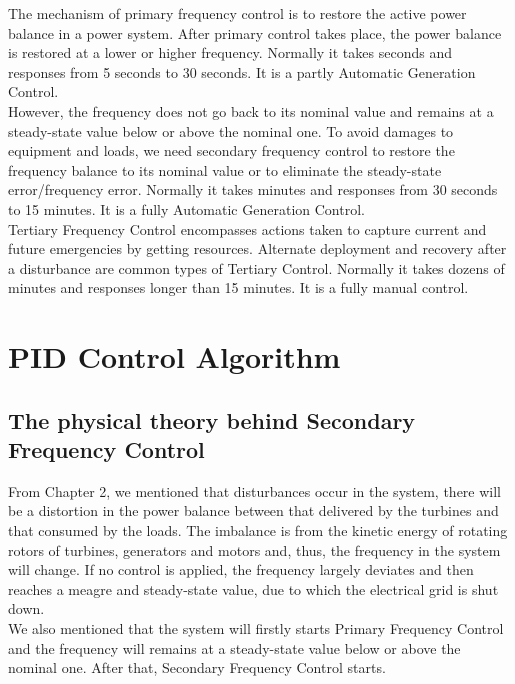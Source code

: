 \documentclass{report}
\begin{document}
The mechanism of primary frequency control is to restore the active power balance in a power system. After primary control takes place, the power balance is restored at a lower or higher frequency. Normally it takes seconds and responses from 5 seconds to 30 seconds. It is a partly Automatic Generation Control.\\


However, the frequency does not go back to its nominal value and remains at a steady-state value below or above the nominal one. To avoid damages to equipment and loads, we need secondary frequency control to restore the frequency balance to its nominal value or to eliminate the steady-state error/frequency error. Normally it takes minutes and responses from 30 seconds to 15 minutes. It is a fully Automatic Generation Control.\\


Tertiary Frequency Control encompasses actions taken to capture current and future emergencies by getting resources. Alternate deployment and recovery after a disturbance are common types of Tertiary Control. Normally it takes dozens of minutes and responses longer than 15 minutes. It is a fully manual control.



\chapter{PID Control Algorithm}
\section{The physical theory behind Secondary Frequency Control} %
From Chapter 2, we mentioned that disturbances occur in the system, there will be a distortion in the power balance between that delivered by the turbines and that consumed by the loads. The imbalance is from the kinetic energy of rotating rotors of turbines, generators and motors and, thus, the frequency in the system will change. If no control is applied, the frequency largely deviates and then reaches a meagre and steady-state value, due to which the electrical grid is shut down. \\

We also mentioned that the system will firstly starts Primary Frequency Control and the frequency will remains at a steady-state value below or above the nominal one. After that, Secondary Frequency Control starts.\\
\end{document}
